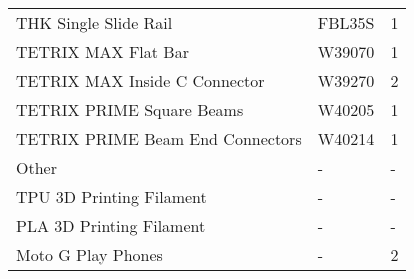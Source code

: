 \documentclass[12pt]{article}
\begin{document}
\begin{table}[]
\begin{tabular}{lll}
THK Single Slide Rail & FBL35S & 1 \\
TETRIX MAX Flat Bar & W39070 & 1 \\
TETRIX MAX Inside C Connector & W39270 & 2 \\
TETRIX PRIME Square Beams & W40205 & 1 \\
TETRIX PRIME Beam End Connectors & W40214 & 1 \\
\rowcolor[HTML]{FFCC67} Other & - & - \\ \hline
TPU 3D Printing Filament & - & - \\
PLA 3D Printing Filament & - & - \\
Moto G Play Phones & - & 2 \\
\end{tabular}
\end{table}
\end{document}
